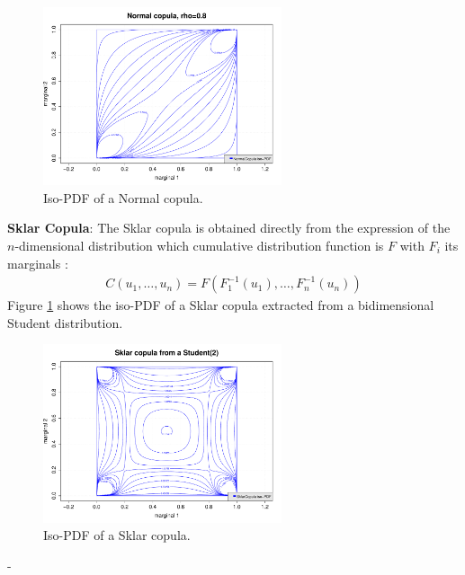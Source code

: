 {  \begin{figure}[H]
    \begin{center}
      \includegraphics[width=7cm]{Figures/NormalCopula.pdf}
      \caption{Iso-PDF of a  Normal copula.}
    \end{center}
  \end{figure}






  {\bf Sklar Copula}: The Sklar copula is obtained directly from the expression of the $n$-dimensional distribution which cumulative distribution function is $F$ with $F_i$ its marginals :
  \begin{align*}
    C(u_1, \dots, u_n) = F(F_1^{-1}(u_1), \dots, F_n^{-1}(u_n))
  \end{align*}
  Figure \ref{SklarEx} shows the iso-PDF of a Sklar copula extracted from a bidimensional Student distribution.

  \begin{figure}[H]
    \begin{center}
      \includegraphics[width=7cm]{Figures/SklarCopula.pdf}
      \caption{Iso-PDF of a  Sklar copula.\label{SklarEx}}
    \end{center}
  \end{figure}



}

{
  -
}

